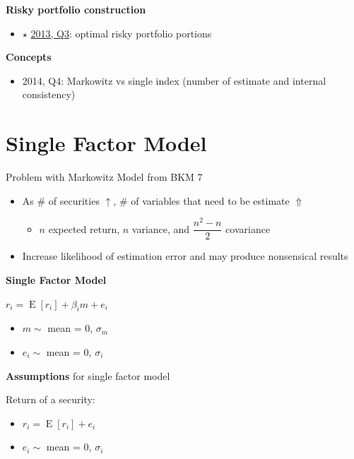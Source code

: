 \documentclass[]{book}
\providecommand{\tightlist}{%
  \setlength{\itemsep}{0pt}\setlength{\parskip}{0pt}}
\theoremstyle{definition}
\theoremstyle{definition}
\theoremstyle{remark}
\begin{document}
\textbf{Risky portfolio construction}

\begin{itemize}
\tightlist
\item
  \(\star\) \protect\hyperlink{2013-3}{2013, Q3}: optimal risky
  portfolio portions
\end{itemize}

\textbf{Concepts}

\begin{itemize}
\tightlist
\item
  2014, Q4: Markowitz vs single index (number of estimate and internal
  consistency)
\end{itemize}

\section{Single Factor Model}\label{single-factor-model}

Problem with Markowitz Model from BKM 7

\begin{itemize}
\item
  As \# of securities \(\uparrow\), \# of variables that need to be
  estimate \(\Uparrow\)

  \begin{itemize}
  \tightlist
  \item
    \(n\) expected return, \(n\) variance, and \(\dfrac{n^2 - n}{2}\)
    covariance
  \end{itemize}
\item
  Increase likelihood of estimation error and may produce nonsensical
  results
\end{itemize}

 \textbf{Single Factor Model}

\(r_i = \operatorname{E}[r_i] + \beta_i m + e_i\)

\begin{itemize}
\item
  \(m \sim\) mean = 0, \(\sigma_m\)
\item
  \(e_i \sim\) mean = 0, \(\sigma_i\)
\end{itemize}

\textbf{Assumptions} for single factor model

Return of a security:

\begin{itemize}
\item
  \(r_i = \operatorname{E}[r_i] + e_i\)
\item
  \(e_i \sim\) mean = 0, \(\sigma_i\)
\end{itemize}
\end{document}
